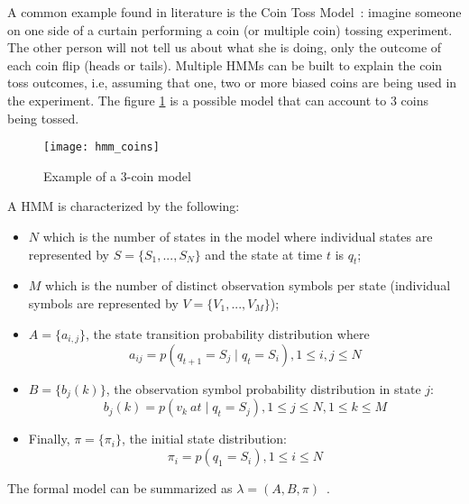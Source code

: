 A common example found in literature is the Coin Toss Model~\cite{Rabiner1989}: 
imagine someone on one side of a curtain performing a coin (or multiple coin) 
tossing experiment. The other person will not tell us about what she is doing, 
only the outcome of each coin flip (heads or tails). Multiple HMMs can be built 
to explain the coin toss outcomes, i.e, assuming that one, two or more biased 
coins are being used in the experiment. The figure \ref{fig:hmm_coins} is a 
possible model that can account to 3 coins being tossed.

\begin{figure}[h]
    \begin{center}
        \leavevmode
        \texttt{[image: hmm\_coins]}
        \caption{Example of a 3-coin model \cite{Rabiner1989}}
        \label{fig:hmm_coins}
    \end{center}
\end{figure}

A HMM is characterized by the following:
\begin{itemize}
    \item $ N $ which is the number of states in the model where individual 
    states are represented by $ S = \{ S_{1}, ..., S_{N} \} $ and the state at 
    time $ t $ is $ q_{t} $;
    \item $ M $ which is the number of distinct observation symbols per state 
    (individual symbols are represented by $ V = \{V_{1}, ..., V_{M} \} $);
    \item $ A = \{ a_{i, j} \} $, the state transition probability 
    distribution where
    \begin{equation}
    a_{ij} = p(q_{t+1} = S_{j} \mid q_{t} = S_{i}), 1 \leq i, j \leq N
    \end{equation}
    \item $ B = \{ b_{j}(k) \} $, the observation symbol probability 
    distribution in state $ j $:
    \begin{equation}
    b_{j}(k) = p(v_{k}~at \mid q_{t} = S_{j}), 1 \leq j \leq N, 1 \leq k 
    \leq M
    \end{equation}
    \item Finally, $ \pi = \{ \pi_{i} \} $, the initial state distribution:
    \begin{equation}
    \pi_{i} = p(q_{1} = S_{i}), 1 \leq i \leq N
    \end{equation}
\end{itemize}

The formal model can be summarized as $ \lambda = (A, B, \pi) 
$~\cite{Rabiner1989}.

